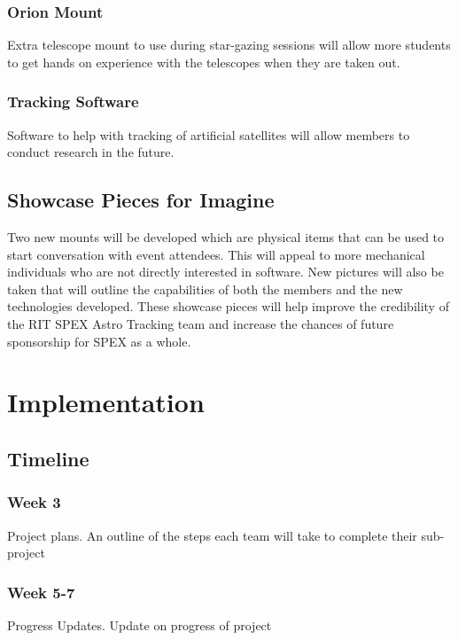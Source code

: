 \documentclass[conference]{IEEEtran} %
\begin{document}
    \subsubsection{Orion Mount}
    \label{sec:orionmounts}
    Extra telescope mount to use during star-gazing sessions will allow more students to get hands on experience with the telescopes when they are taken out.
    \subsubsection{Tracking Software}
    \label{sec:trackingmounts}
    Software to help with tracking of artificial satellites will allow members to conduct research in the future.

\subsection{Showcase Pieces for Imagine}
\label{sec:showcasepieces}
Two new mounts will be developed which are physical items that can be used to start conversation with event attendees.  This will appeal to more mechanical individuals who are not directly interested in software.
New pictures will also be taken that will outline the capabilities of both the members and the new technologies developed. These showcase pieces will help improve the credibility of the RIT SPEX Astro Tracking team and increase the chances of future sponsorship for SPEX as a whole.


\section{Implementation}
\label{sec:implementation}



\subsection{Timeline}
\label{subsec:timeline}
    \subsubsection*{Week 3}
    Project plans.  An outline of the steps each team will take to complete their sub-project
    \subsubsection*{Week 5-7}
    Progress Updates. Update on progress of project
\end{document}
